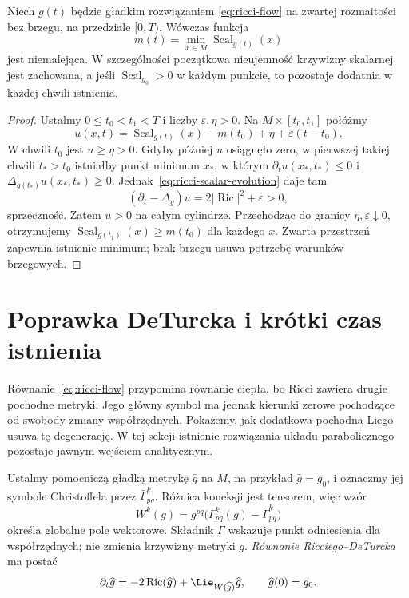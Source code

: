 \begin{twierdzenie}
\label{thm:ricci-scalar-max-principle}
Niech $g(t)$ będzie gładkim rozwiązaniem
\eqref{eq:ricci-flow} na zwartej rozmaitości bez brzegu,
na przedziale $[0,T)$. Wówczas funkcja
\[
 m(t)=\min_{x\in M}\operatorname{Scal}_{g(t)}(x)
\]
jest niemalejąca. W szczególności początkowa
nieujemność krzywizny skalarnej jest zachowana,
a jeśli $\operatorname{Scal}_{g_0}>0$ w każdym punkcie,
to pozostaje dodatnia w każdej chwili istnienia.
\end{twierdzenie}
\begin{proof}
Ustalmy $0\leq t_0<t_1<T$ i liczby $\varepsilon,\eta>0$.
Na $M\times[t_0,t_1]$ połóżmy
\[
 u(x,t)=\operatorname{Scal}_{g(t)}(x)
       -m(t_0)+\eta+\varepsilon(t-t_0).
\]
W chwili $t_0$ jest $u\geq\eta>0$.
Gdyby później $u$ osiągnęło zero, w pierwszej takiej
chwili $t_*>t_0$ istniałby punkt minimum $x_*$,
w którym $\partial_tu(x_*,t_*)\leq0$ i
$\Delta_{g(t_*)}u(x_*,t_*)\geq0$.
Jednak~\eqref{eq:ricci-scalar-evolution} daje tam
\[
 (\partial_t-\Delta_g)u
   =2|\operatorname{Ric}|^2+\varepsilon>0,
\]
sprzeczność. Zatem $u>0$ na całym cylindrze.
Przechodząc do granicy $\eta,\varepsilon\downarrow0$,
otrzymujemy
$\operatorname{Scal}_{g(t_1)}(x)\geq m(t_0)$
dla każdego $x$. Zwarta przestrzeń zapewnia
istnienie minimum; brak brzegu usuwa potrzebę
warunków brzegowych.
\end{proof}

\section{Poprawka DeTurcka i krótki czas istnienia}
\label{sec:ricci-deturck}

Równanie~\eqref{eq:ricci-flow} przypomina równanie
ciepła, bo Ricci zawiera drugie pochodne metryki.
Jego główny symbol ma jednak kierunki zerowe
pochodzące od swobody zmiany współrzędnych.
Pokażemy, jak dodatkowa pochodna Liego usuwa tę
degenerację. W tej sekcji istnienie rozwiązania
układu parabolicznego pozostaje jawnym wejściem
analitycznym.

Ustalmy pomocniczą gładką metrykę $\bar g$ na $M$,
na przykład $\bar g=g_0$, i oznaczmy jej symbole
Christoffela przez $\bar\Gamma^k_{pq}$. Różnica
koneksji jest tensorem, więc wzór
\begin{equation}\label{eq:ricci-deturck-vector}
 W^k(g)=g^{pq}\bigl(\Gamma^k_{pq}(g)
                            -\bar\Gamma^k_{pq}\bigr)
\end{equation}
określa globalne pole wektorowe. Składnik
$\bar\Gamma$ wskazuje punkt odniesienia dla
współrzędnych; nie zmienia krzywizny metryki $g$.
\emph{Równanie Ricciego--DeTurcka} ma postać
\begin{equation}\label{eq:ricci-deturck}
 \partial_t\widehat g
  =-2\operatorname{Ric}(\widehat g)
    +\Lie_{W(\widehat g)}\widehat g,
 \qquad \widehat g(0)=g_0.
\end{equation}

